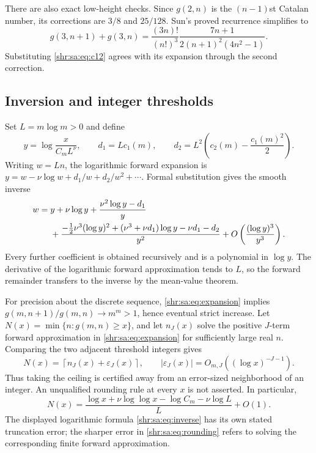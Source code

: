 \documentclass[11pt,letterpaper]{article}
\numberwithin{equation}{section}
\theoremstyle{definition}
\newcommand{\1}{\mathbf 1}
\begin{document}
There are also exact low-height checks. Since $g(2,n)$ is the $(n-1)$st Catalan number, its corrections are $3/8$ and $25/128$. Sun's proved recurrence simplifies to
\[
 g(3,n+1)+g(3,n)=\frac{(3n)!}{(n!)^3}
                    \frac{7n+1}{2(n+1)^2(4n^2-1)}.
\]
Substituting \eqref{shr:sa:eq:c12} agrees with its expansion through the second correction.

\subsection{Inversion and integer thresholds}
Set $L=m\log m>0$ and define
\[
 y=\log\frac{x}{C_mL^\nu},\qquad d_1=Lc_1(m),\qquad
 d_2=L^2\left(c_2(m)-\frac{c_1(m)^2}{2}\right).
\]
Writing $w=Ln$, the logarithmic forward expansion is
$y=w-\nu\log w+d_1/w+d_2/w^2+\cdots$. Formal substitution gives the smooth inverse
\begin{align}\label{shr:sa:eq:inverse}
 w={}&y+\nu\log y+\frac{\nu^2\log y-d_1}{y}\notag\\
 &+\frac{-\tfrac12\nu^3(\log y)^2
       +(\nu^3+\nu d_1)\log y-\nu d_1-d_2}{y^2}
       +O\left(\frac{(\log y)^3}{y^3}\right).
\end{align}
Every further coefficient is obtained recursively and is a polynomial in $\log y$. The derivative of the logarithmic forward approximation tends to $L$, so the forward remainder transfers to the inverse by the mean-value theorem.

For precision about the discrete sequence, \eqref{shr:sa:eq:expansion} implies
$g(m,n+1)/g(m,n)\to m^m>1$, hence eventual strict increase. Let
$N(x)=\min\{n:g(m,n)\ge x\}$, and let $n_J(x)$ solve the positive $J$-term forward approximation in \eqref{shr:sa:eq:expansion} for sufficiently large real $n$. Comparing the two adjacent threshold integers gives
\begin{equation}\label{shr:sa:eq:rounding}
 N(x)=\left\lceil n_J(x)+\varepsilon_J(x)\right\rceil,
 \qquad |\varepsilon_J(x)|=O_{m,J}((\log x)^{-J-1}).
\end{equation}
Thus taking the ceiling is certified away from an error-sized neighborhood of an integer. An unqualified rounding rule at every $x$ is not asserted. In particular,
\[
 N(x)=\frac{\log x+\nu\log\log x-\log C_m-\nu\log L}{L}+O(1).
\]
The displayed logarithmic formula \eqref{shr:sa:eq:inverse} has its own stated truncation error; the sharper error in \eqref{shr:sa:eq:rounding} refers to solving the corresponding finite forward approximation.
\end{document}
